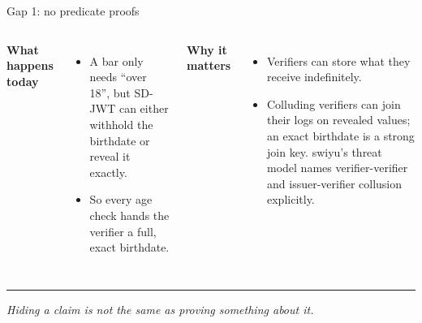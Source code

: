 \documentclass[aspectratio=169]{beamer}
\newcommand{\sourcefoot}{}
\newcommand{\setsources}[1]{\renewcommand{\sourcefoot}{#1}}
\newcommand{\labelhead}[1]{{\small\bfseries\color{zkblue}#1}\par\vspace{0.25em}}
\newcommand{\takeaway}[1]{%
  \vspace{0.45em}%
  {\color{zkrule}\rule{\linewidth}{0.5pt}}\par
  \vspace{0.3em}%
  {\small\itshape\color{zkmuted}#1\par}}
\begin{document}
\setsources{\href{https://swiyu-admin-ch.github.io/threat-model/}{swiyu Threat Model}; \href{https://www.rfc-editor.org/rfc/rfc9901.html}{RFC 9901}}
\begin{frame}{Gap 1: no predicate proofs}
  \begin{columns}[T,onlytextwidth]
      \labelhead{What happens today}
      \begin{itemize}
        \item A bar only needs ``over 18'', but SD-JWT can either withhold the
          birthdate or reveal it exactly.
        \item So every age check hands the verifier a full, exact birthdate.
      \end{itemize}

      \labelhead{Why it matters}
      \begin{itemize}
        \item Verifiers can store what they receive indefinitely.
        \item Colluding verifiers can join their logs on revealed values; an
          exact birthdate is a strong join key. swiyu's threat model names
          verifier-verifier and issuer-verifier collusion explicitly.
      \end{itemize}
  \end{columns}

  \takeaway{Hiding a claim is not the same as proving something about it.}
\end{frame}
\end{document}
